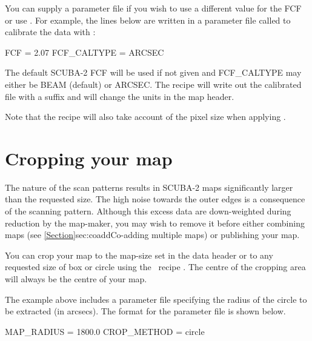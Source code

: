 You can supply a parameter file if you wish to use a different value
for the FCF or use \fcfa. For example, the lines below are written in a parameter
file called  to calibrate the data  with :

\begin{terminalv}
FCF = 2.07
FCF_CALTYPE = ARCSEC
\end{terminalv}

The default SCUBA-2 FCF will be used if not given and FCF\_CALTYPE may either
be BEAM (default) or ARCSEC. The recipe will write out the calibrated
file with a  suffix and will change the units in the map
header.

\begin{terminalv}
\end{terminalv}

Note that the recipe will also take account of the pixel size when
applying \fcfa.

\section{Cropping your map}
\label{sec:crop}

The nature of the scan patterns results in SCUBA-2 maps significantly
larger than the requested size. The high noise towards the outer edges
is a consequence of the scanning pattern. Although this excess data
are down-weighted during reduction by the map-maker, you may wish to
remove it before either combining maps (see
\cref{Section}{sec:coadd}{Co-adding multiple maps}) or publishing your
map.

You can crop your map to the map-size set in the data header or to any
requested size of box or circle using the \picard\ recipe
.
The centre of the cropping area will always be the centre of your map.

\begin{terminalv}
\end{terminalv}

The example above includes a parameter file specifying the radius of
the circle to be extracted (in arcsecs).  The format for the parameter
file is shown below.

\begin{terminalv}
MAP_RADIUS = 1800.0
CROP_METHOD = circle
\end{terminalv}


